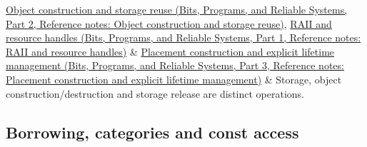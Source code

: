 {\begin{longtable}[]
\href{../01-Bits-Programs-and-Reliable-Systems-P02/main.pdf\#nameddest=appendix-a82f9c438857}{Object construction and storage reuse (Bits, Programs, and Reliable Systems, Part 2, Reference notes: Object construction and storage reuse)}, \href{../01-Bits-Programs-and-Reliable-Systems-P01/main.pdf\#nameddest=appendix-69739d3ab49b}{RAII and resource handles (Bits, Programs, and Reliable Systems, Part 1, Reference notes: RAII and resource handles)} & \href{../01-Bits-Programs-and-Reliable-Systems-P03/main.pdf\#nameddest=appendix-f56c3e43fd4e}{Placement construction and explicit lifetime management (Bits, Programs, and Reliable Systems, Part 3, Reference notes: Placement construction and explicit lifetime management)} & Storage, object construction/destruction and storage release are distinct operations. \\
\end{longtable}
}

\subsection{Borrowing, categories and const access}\label{appendix-4ad47bdd269a-borrowing-categories-and-const-access}

\hypertarget{appendix-4ad47bdd269a-borrowing-categories-and-const-access}{}

